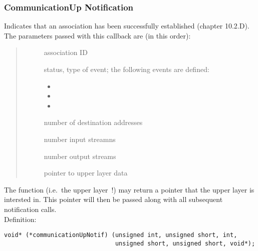 \documentclass[10pt]{article}
\newcommand{\bv}{\vspace{0,1cm}\noindent \\ Definition:\footnotesize\begin{verbatim}}
\newcommand{\n}{\normalsize}
\newcommand{\no}{ }
\begin{document}
\subsubsection{CommunicationUp Notification}
Indicates that an association has been successfully established (chapter 10.2.D).
The parameters passed with this callback are (in this order):
\begin{quote} \begin{description} \no
 \item[] association ID
 \item[] status, type of event; 
	the following events are defined: 
	\begin{itemize}
	\item {}
	\item {}
	\item {}
	\end{itemize}
 \item[] number of destination addresses
 \item[] number input streamns
 \item[] number output streams
 \item[] pointer to upper layer data
\end{description} \end{quote}
The function (i.e.\ the upper layer~!) may return a pointer that
the upper layer is intersted in.
This pointer will then be passed along with all subsequent notification
calls.
\bv
void* (*communicationUpNotif) (unsigned int, unsigned short, int,
                               unsigned short, unsigned short, void*);
\end{verbatim}\n
\end{document}
